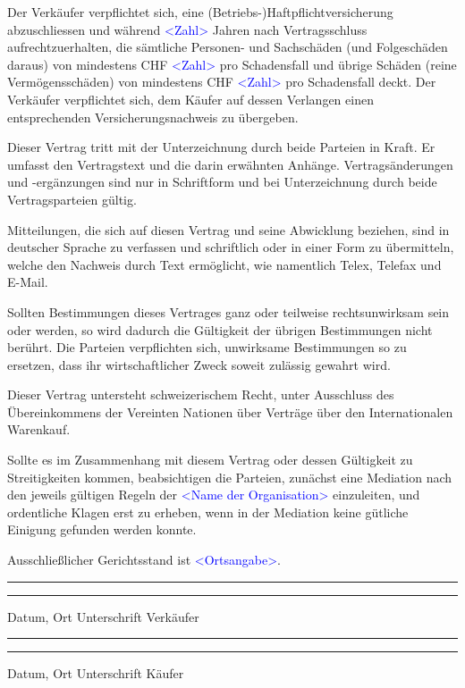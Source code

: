 \documentclass[parskip=half]{scrreprt}
\begin{document}
\begin{contract}
Der Verkäufer verpflichtet sich, eine (Betriebs-)Haftpflichtversicherung abzuschliessen und während \textcolor{blue}{<Zahl>} Jahren nach Vertragsschluss aufrechtzuerhalten, die sämtliche Personen- und Sachschäden (und Folgeschäden daraus) von mindestens CHF \textcolor{blue}{<Zahl>} pro Schadensfall und übrige Schäden (reine Vermögensschäden) von mindestens CHF \textcolor{blue}{<Zahl>} pro Schadensfall deckt. Der Verkäufer verpflichtet sich, dem Käufer auf dessen Verlangen einen entsprechenden Versicherungsnachweis zu übergeben.




Dieser Vertrag tritt mit der Unterzeichnung durch beide Parteien in Kraft. Er umfasst den Vertragstext und die darin erwähnten Anhänge. Vertragsänderungen und -ergänzungen sind nur in Schriftform und bei Unterzeichnung durch beide Vertragsparteien gültig.

Mitteilungen, die sich auf diesen Vertrag und seine Abwicklung beziehen, sind in deutscher Sprache zu verfassen und schriftlich oder in einer Form zu übermitteln, welche den Nachweis durch Text ermöglicht, wie namentlich Telex, Telefax und E-Mail.




Sollten Bestimmungen dieses Vertrages ganz oder teilweise rechtsunwirksam sein oder werden, so wird dadurch die Gültigkeit der übrigen Bestimmungen nicht berührt. Die Parteien verpflichten sich, unwirksame Bestimmungen so zu ersetzen, dass ihr wirtschaftlicher Zweck soweit zulässig gewahrt wird.




Dieser Vertrag untersteht schweizerischem Recht, unter Ausschluss des Übereinkommens der Vereinten Nationen über Verträge über den Internationalen Warenkauf.




Sollte es im Zusammenhang mit diesem Vertrag oder dessen Gültigkeit zu Streitigkeiten kommen, beabsichtigen die Parteien, zunächst eine Mediation nach den jeweils gültigen Regeln der \textcolor{blue}{<Name der Organisation>} einzuleiten, und ordentliche Klagen erst zu erheben, wenn in der Mediation keine gütliche Einigung gefunden werden konnte.

Ausschließlicher Gerichtsstand ist \textcolor{blue}{<Ortsangabe>}.

\end{contract}

\vspace{50pt} 
\noindent\rule{7cm}{.4pt}\hfill\rule{7cm}{.4pt}\par 
\noindent Datum, Ort \hfill Unterschrift Verkäufer

\vspace{50pt} 
\noindent\rule{7cm}{.4pt}\hfill\rule{7cm}{.4pt}\par 
\noindent Datum, Ort \hfill Unterschrift Käufer
\end{document}
